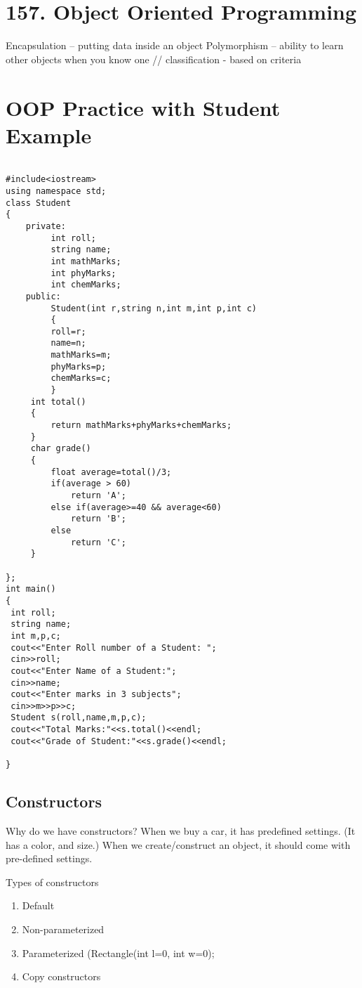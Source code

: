 \documentclass[a4paper,12pt]{book}
\begin{document}
\section{157. Object Oriented Programming}
Encapsulation
-- putting data inside an object
Polymorphism
-- ability to learn other objects when you know one
// classification - based on criteria

\section{OOP Practice with Student Example}

\begin{lstlisting}

#include<iostream>
using namespace std;
class Student
{
    private:
         int roll;
         string name;
         int mathMarks;
         int phyMarks;
         int chemMarks;
    public:
         Student(int r,string n,int m,int p,int c)
         {
         roll=r;
         name=n;
         mathMarks=m;
         phyMarks=p;
         chemMarks=c;
         }
     int total()
     {
         return mathMarks+phyMarks+chemMarks;
     }
     char grade()
     {
         float average=total()/3;
         if(average > 60)
             return 'A';
         else if(average>=40 && average<60)
             return 'B';
         else
             return 'C';
     }

};
int main()
{
 int roll;
 string name;
 int m,p,c;
 cout<<"Enter Roll number of a Student: ";
 cin>>roll;
 cout<<"Enter Name of a Student:";
 cin>>name;
 cout<<"Enter marks in 3 subjects";
 cin>>m>>p>>c;
 Student s(roll,name,m,p,c);
 cout<<"Total Marks:"<<s.total()<<endl;
 cout<<"Grade of Student:"<<s.grade()<<endl;

}

\end{lstlisting}


\subsection{Constructors}
Why do we have constructors? When we buy a car, it has predefined settings. (It has a color, and size.) When we create/construct an object, it should come with pre-defined settings. 

Types of constructors
\begin{enumerate}
	\item Default
	\item Non-parameterized
	\item Parameterized (Rectangle(int l=0, int w=0); 
	\item Copy constructors
\end{enumerate}
\end{document}
